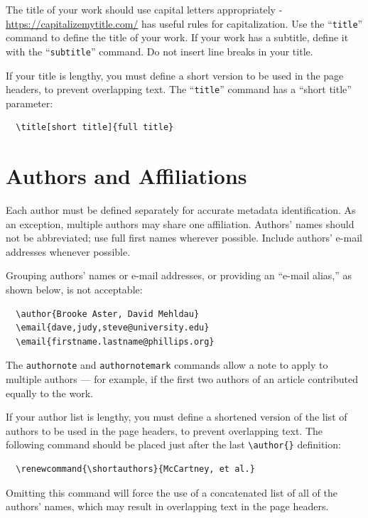 \documentclass[
  letterpaper,
  DIV=11,
  numbers=noendperiod]{scrartcl}
\begin{document}
The title of your work should use capital letters appropriately -
\url{https://capitalizemytitle.com/} has useful rules for
capitalization. Use the ``\texttt{title}'' command to define the title
of your work. If your work has a subtitle, define it with the
``\texttt{subtitle}'' command. Do not insert line breaks in your title.

If your title is lengthy, you must define a short version to be used in
the page headers, to prevent overlapping text. The ``\texttt{title}''
command has a ``short title'' parameter:

\begin{verbatim}
  \title[short title]{full title}
\end{verbatim}

\hypertarget{authors-and-affiliations}{%
\section{Authors and Affiliations}\label{authors-and-affiliations}}

Each author must be defined separately for accurate metadata
identification. As an exception, multiple authors may share one
affiliation. Authors' names should not be abbreviated; use full first
names wherever possible. Include authors' e-mail addresses whenever
possible.

Grouping authors' names or e-mail addresses, or providing an ``e-mail
alias,'' as shown below, is not acceptable:

\begin{verbatim}
  \author{Brooke Aster, David Mehldau}
  \email{dave,judy,steve@university.edu}
  \email{firstname.lastname@phillips.org}
\end{verbatim}

The \texttt{authornote} and \texttt{authornotemark} commands allow a
note to apply to multiple authors --- for example, if the first two
authors of an article contributed equally to the work.

If your author list is lengthy, you must define a shortened version of
the list of authors to be used in the page headers, to prevent
overlapping text. The following command should be placed just after the
last \texttt{\textbackslash{}author\{\}} definition:

\begin{verbatim}
  \renewcommand{\shortauthors}{McCartney, et al.}
\end{verbatim}

Omitting this command will force the use of a concatenated list of all
of the authors' names, which may result in overlapping text in the page
headers.
\end{document}
